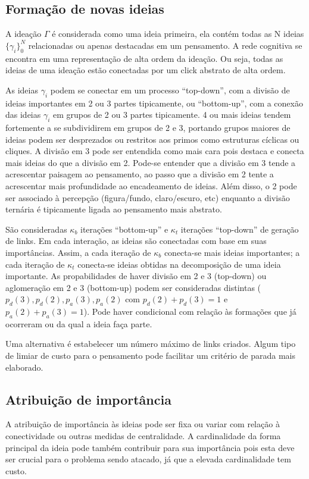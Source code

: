 \documentclass[a4paper,12pt,titlepage]{article}
\begin{document}
\subsection{Formação de novas ideias}
A ideação $\Gamma$ é considerada como uma ideia primeira, ela contém todas as N ideias $\{\gamma_i\}_0^{N}$ relacionadas ou apenas destacadas em um pensamento.
A rede cognitiva se encontra em uma representação de alta ordem da ideação. Ou seja, todas as ideias de uma ideação estão conectadas por um click abstrato de alta ordem.

As ideias $\gamma_i$ podem se conectar em um processo ``top-down'', com a divisão de ideias importantes em 2 ou 3 partes tipicamente, ou ``bottom-up'', com a conexão das ideias $\gamma_i$ em grupos de 2 ou 3 partes tipicamente. 4 ou mais ideias tendem fortemente a se subdividirem em grupos de 2 e 3, portando grupos maiores de ideias podem ser desprezados ou restritos aos primos como estruturas cíclicas ou cliques. A divisão em 3 pode ser entendida como mais cara pois destaca e conecta mais ideias do que a divisão em 2. Pode-se entender que a divisão em 3 tende a acrescentar paisagem ao pensamento, ao passo que a divisão em 2 tente a acrescentar mais profundidade ao encadeamento de ideias. Além disso, o 2 pode ser associado à percepção (figura/fundo, claro/escuro, etc) enquanto a divisão ternária é tipicamente ligada ao pensamento mais abstrato.

São consideradas $\kappa_b$ iterações ``bottom-up'' e $\kappa_t$ iterações ``top-down'' de geração de links. Em cada interação, as ideias são conectadas com base em suas importâncias. Assim, a cada iteração de $\kappa_b$ conecta-se mais ideias importantes; a cada iteração de $\kappa_t$ conecta-se ideias obtidas na decomposição de uma ideia importante. As propabilidades de haver divisão em 2 e 3 (top-down) ou aglomeração em 2 e 3 (bottom-up) podem ser consideradas distintas ($p_d(3), p_d(2), p_a(3), p_a(2)$ com $p_d(2)+p_d(3)=1$ e  $p_a(2)+p_a(3)=1$). Pode haver condicional com relação às formações que já ocorreram ou da qual a ideia faça parte.

Uma alternativa é estabelecer um número máximo de links criados. Algum tipo de limiar de custo para o pensamento pode facilitar um critério de parada mais elaborado. 

\subsection{Atribuição de importância}
A atribuição de importância às ideias pode ser fixa ou variar com relação
à conectividade ou outras medidas de centralidade.
A cardinalidade da forma principal da ideia pode também contribuir para sua importância
pois esta deve ser crucial para o problema sendo atacado, já que a elevada cardinalidade tem custo.
\end{document}
